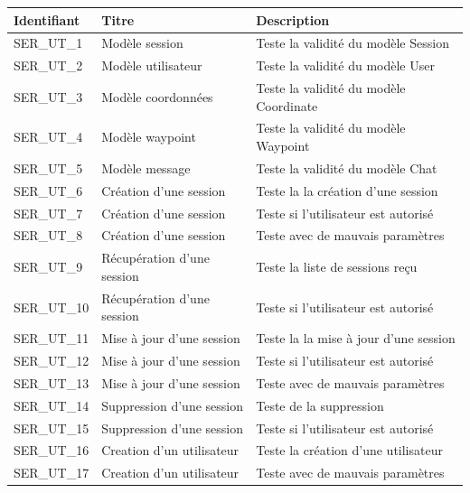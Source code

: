 \documentclass[titlepage, 12pt]{report}
\begin{document}
\begin{table}[ht]
\begin{tabularx}{\textwidth}{|X|X|X|}
\hline
Identifiant & Titre & Description \\
\hline
SER\_UT\_1 & Modèle session & Teste la validité du modèle Session \\
\hline
SER\_UT\_2 & Modèle utilisateur & Teste la validité du modèle User \\
\hline
SER\_UT\_3 & Modèle coordonnées & Teste la validité du modèle Coordinate \\
\hline
SER\_UT\_4 & Modèle waypoint & Teste la validité du modèle Waypoint \\
\hline
SER\_UT\_5 & Modèle message & Teste la validité du modèle Chat \\
\hline
SER\_UT\_6 & Création d'une session & Teste la la création d'une session \\
\hline
SER\_UT\_7 & Création d'une session & Teste si l'utilisateur est autorisé \\
\hline
SER\_UT\_8 & Création d'une session & Teste avec de mauvais paramètres \\
\hline
SER\_UT\_9 & Récupération d'une session & Teste la liste de sessions reçu \\
\hline
SER\_UT\_10 & Récupération d'une session & Teste si l'utilisateur est autorisé \\
\hline
SER\_UT\_11 & Mise à jour d'une session & Teste la la mise à jour d'une session \\
\hline
SER\_UT\_12 & Mise à jour d'une session & Teste si l'utilisateur est autorisé \\
\hline
SER\_UT\_13 & Mise à jour d'une session & Teste avec de mauvais paramètres \\
\hline
SER\_UT\_14 & Suppression d'une session & Teste de la suppression \\
\hline
SER\_UT\_15 & Suppression d'une session & Teste si l'utilisateur est autorisé \\

\hline
SER\_UT\_16 & Creation d'un utilisateur &  Teste la création d'une utilisateur \\
\hline
SER\_UT\_17 & Creation d'un utilisateur &  Teste avec de mauvais paramètres \\


\hline
\end{tabularx}
\end{table}
\end{document}
